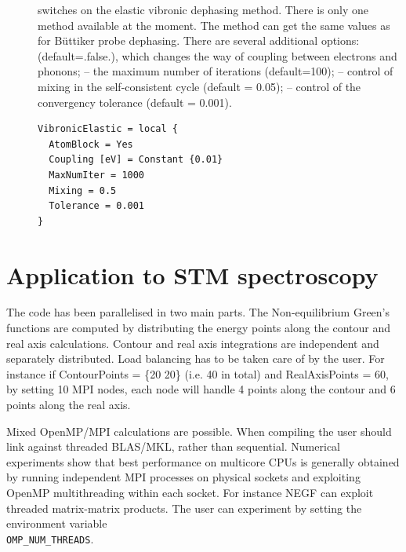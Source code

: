 {\begin{description}

\item[] switches on the elastic vibronic dephasing method. There is only one method  available at the moment. The  method can get the same values as for B\"uttiker probe dephasing. There are several additional options: 
 (default=.false.), which changes the way of coupling between electrons and phonons;  -- the maximum number of iterations (default=100);  -- control of mixing in the self-consistent cycle (default = 0.05);  -- control of the convergency tolerance (default = 0.001). 
  
\begin{verbatim}
VibronicElastic = local {
  AtomBlock = Yes
  Coupling [eV] = Constant {0.01}
  MaxNumIter = 1000
  Mixing = 0.5
  Tolerance = 0.001
}
\end{verbatim}
  
\end{description}

\section{Application to STM spectroscopy}
\label{sec_stm}


} %


The code has been parallelised in two main parts. The Non-equilibrium Green's
functions are computed by distributing the energy points along the contour and
real axis calculations. Contour and real axis integrations are independent and
separately distributed. Load balancing has to be taken care of by the user. For
instance if ContourPoints = \{20 20\} (i.e. 40 in total) and RealAxisPoints =
60, by setting 10 MPI nodes, each node will handle 4 points along the contour
and 6 points along the real axis.

Mixed OpenMP/MPI calculations are possible. When compiling \dftbp{} the user
should link against threaded BLAS/MKL, rather than sequential. Numerical
experiments show that best performance on multicore CPUs is generally obtained
by running independent MPI processes on physical sockets and exploiting OpenMP
multithreading within each socket. For instance NEGF can exploit threaded
matrix-matrix products. The user can experiment by setting the environment
variable\\ {\tt OMP\_NUM\_THREADS}.

